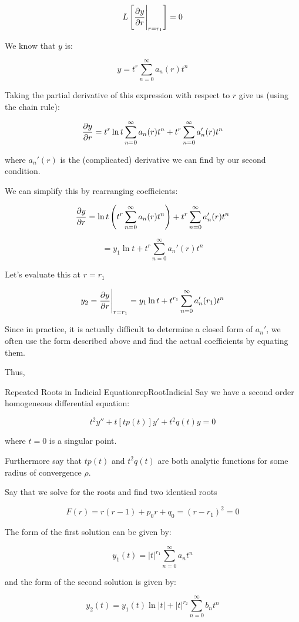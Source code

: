 \documentclass{report}
\begin{document}
{$$L\left[\pdv{y}{r} \Bigg|_{r=r_1}\right] = 0$$

We know that $y$ is:

$$y = t^r\sum_{n=0}^\infty a_n(r)t^n $$

Taking the partial derivative of this expression with respect to $r$ give us (using the chain rule):

$$\pdv{y}{r}(r) = t^r \ln t\sum_{n=0}^\infty a_n(r)t^{n} + t^r\sum_{n=0}^\infty a_n'(r)t^n$$

where $a_n'(r)$ is the (complicated) derivative we can find by our second condition.

We can simplify this by rearranging coefficients:

$$\pdv{y}{r}(r) = \ln t \left( t^r\sum_{n=0}^\infty a_n(r)t^{n}\right)  + t^r\sum_{n=0}^\infty a_n'(r)t^n$$

$$= y_1\ln t  + t^r\sum_{n=0}^\infty a_n'(r)t^n$$

Let's evaluate this at $r=r_1$ 

$$y_2 = \pdv{y}{r} \Bigg|_{r=r_1} = y_1\ln t + t^{r_1}\sum_{n=0}^\infty a_n'(r_1)t^n$$


Since in practice, it is actually difficult to determine a closed form of $a_n'$, we often use the form described above and find the actual coefficients by equating them.

Thus,

\begin{mytheo}{Repeated Roots in Indicial Equation}{repRootIndicial}
	Say we have a second order homogeneous differential equation:
	
	$$t^2y'' + t[tp(t)]y' + t^2q(t)y = 0$$
	
	where $t = 0$ is a singular point.
	
	Furthermore say that $tp(t)$ and $t^2q(t)$ are both analytic functions for some radius of convergence $\rho$.
	
	Say that we solve for the roots and find two identical roots
	
	$$F(r) = r(r-1) + p_0r + q_0 = (r-r_1)^2 = 0$$
	
	The form of the first solution can be given by:
	
	$$y_1(t) = |t|^{r_1}\sum_{n=0}^\infty a_nt^n$$
	
	and the form of the second solution is given by:
	
	$$y_2(t) = y_1(t)\ln|t| + |t|^{r_2}\sum_{n=0}^\infty b_nt^n$$
	
	
	
\end{mytheo}

}
\end{document}

